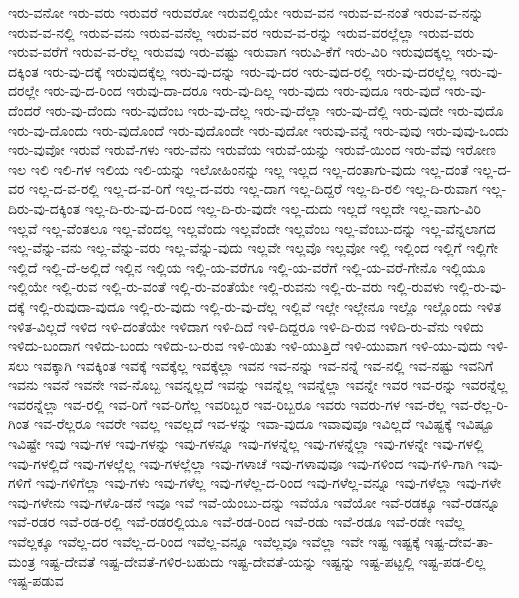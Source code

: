 {ಇರು-ವನೋ
ಇರು-ವರು
ಇರುವರೆ
ಇರುವರೋ
ಇರುವಲ್ಲಿಯೇ
ಇರುವ-ವನ
ಇರುವ-ವ-ನಂತೆ
ಇರುವ-ವ-ನನ್ನು
ಇರುವ-ವ-ನಲ್ಲಿ
ಇರುವ-ವನು
ಇರುವ-ವನೆಲ್ಲ
ಇರುವ-ವರ
ಇರುವ-ವ-ರನ್ನು
ಇರುವ-ವರಲ್ಲೆಲ್ಲಾ
ಇರುವ-ವರು
ಇರುವ-ವರೆಗೆ
ಇರುವ-ವ-ರೆಲ್ಲ
ಇರುವವು
ಇರು-ವಷ್ಟು
ಇರುವಾಗ
ಇರುವಿ-ಕೆಗೆ
ಇರು-ವಿರಿ
ಇರುವುದಕ್ಕಲ್ಲ
ಇರು-ವು-ದಕ್ಕಿಂತ
ಇರು-ವು-ದಕ್ಕೆ
ಇರುವುದಕ್ಕೆಲ್ಲ
ಇರು-ವು-ದನ್ನು
ಇರು-ವು-ದರ
ಇರು-ವುದ-ರಲ್ಲಿ
ಇರು-ವು-ದರಲ್ಲೆಲ್ಲ
ಇರು-ವು-ದರಲ್ಲೇ
ಇರು-ವು-ದ-ರಿಂದ
ಇರುವು-ದಾ-ದರೂ
ಇರು-ವು-ದಿಲ್ಲ
ಇರು-ವುದು
ಇರು-ವುದೂ
ಇರು-ವುದೆ
ಇರು-ವು-ದೆಂದರೆ
ಇರು-ವು-ದೆಂದು
ಇರು-ವುದೆಂಬ
ಇರು-ವು-ದೆಲ್ಲ
ಇರು-ವು-ದೆಲ್ಲಾ
ಇರು-ವು-ದೆಲ್ಲಿ
ಇರು-ವುದೇ
ಇರು-ವುದೊ
ಇರು-ವು-ದೊಂದು
ಇರು-ವುದೊಂದೆ
ಇರು-ವುದೊಂದೇ
ಇರು-ವುದೋ
ಇರುವು-ವನ್ನೆ
ಇರು-ವುವು
ಇರು-ವುವು-ಒಂದು
ಇರು-ವುವೋ
ಇರುವೆ
ಇರುವೆ-ಗಳು
ಇರು-ವೆನು
ಇರುವೆಯ
ಇರುವೆ-ಯನ್ನು
ಇರುವೆ-ಯಿಂದ
ಇರು-ವೆವು
ಇರೋಣ
ಇಲ
ಇಲಿ
ಇಲಿ-ಗಳ
ಇಲಿಯ
ಇಲಿ-ಯನ್ನು
ಇಲೋಹಿಂನನ್ನು
ಇಲ್ಲ
ಇಲ್ಲದ
ಇಲ್ಲ-ದಂತಾಗು-ವುದು
ಇಲ್ಲ-ದಂತೆ
ಇಲ್ಲ-ದ-ವರ
ಇಲ್ಲ-ದ-ವ-ರಲ್ಲಿ
ಇಲ್ಲ-ದ-ವ-ರಿಗೆ
ಇಲ್ಲ-ದ-ವರು
ಇಲ್ಲ-ದಾಗ
ಇಲ್ಲ-ದಿದ್ದರೆ
ಇಲ್ಲ-ದಿ-ರಲಿ
ಇಲ್ಲ-ದಿ-ರುವಾಗ
ಇಲ್ಲ-ದಿರು-ವು-ದಕ್ಕಿಂತ
ಇಲ್ಲ-ದಿ-ರು-ವು-ದ-ರಿಂದ
ಇಲ್ಲ-ದಿ-ರು-ವುದೇ
ಇಲ್ಲ-ದುದು
ಇಲ್ಲದೆ
ಇಲ್ಲದೇ
ಇಲ್ಲ-ವಾಗು-ವಿರಿ
ಇಲ್ಲವೆ
ಇಲ್ಲ-ವೆಂತಲೂ
ಇಲ್ಲ-ವೆಂದಲ್ಲ
ಇಲ್ಲವೆಂದು
ಇಲ್ಲವೆಂದೇ
ಇಲ್ಲವೆಂಬ
ಇಲ್ಲ-ವೆಂಬು-ದನ್ನು
ಇಲ್ಲ-ವೆನ್ನಲಾಗದ
ಇಲ್ಲ-ವೆನ್ನು-ವನು
ಇಲ್ಲ-ವೆನ್ನು-ವರು
ಇಲ್ಲ-ವೆನ್ನು-ವುದು
ಇಲ್ಲವೇ
ಇಲ್ಲವೊ
ಇಲ್ಲವೋ
ಇಲ್ಲಿ
ಇಲ್ಲಿಂದ
ಇಲ್ಲಿಗೆ
ಇಲ್ಲಿಗೇ
ಇಲ್ಲಿದೆ
ಇಲ್ಲಿ-ದೆ-ಅಲ್ಲಿದೆ
ಇಲ್ಲಿನ
ಇಲ್ಲಿಯ
ಇಲ್ಲಿ-ಯ-ವರೆಗೂ
ಇಲ್ಲಿ-ಯ-ವರೆಗೆ
ಇಲ್ಲಿ-ಯ-ವರೆ-ಗೇನೊ
ಇಲ್ಲಿಯೂ
ಇಲ್ಲಿಯೇ
ಇಲ್ಲಿ-ರುವ
ಇಲ್ಲಿ-ರು-ವಂತೆ
ಇಲ್ಲಿ-ರು-ವಂತೆಯೇ
ಇಲ್ಲಿ-ರುವನು
ಇಲ್ಲಿ-ರು-ವರು
ಇಲ್ಲಿ-ರುವಳು
ಇಲ್ಲಿ-ರು-ವು-ದಕ್ಕೆ
ಇಲ್ಲಿ-ರುವುದಾ-ವುದೂ
ಇಲ್ಲಿ-ರು-ವುದು
ಇಲ್ಲಿ-ರು-ವು-ದೆಲ್ಲ
ಇಲ್ಲಿವೆ
ಇಲ್ಲೇ
ಇಲ್ಲೇನೂ
ಇಲ್ಲೊ
ಇಲ್ಲೊಂದು
ಇಳಿತ
ಇಳಿತ-ವಿಲ್ಲದೆ
ಇಳಿದ
ಇಳಿ-ದಂತೆಯೇ
ಇಳಿದಾಗ
ಇಳಿ-ದಿದೆ
ಇಳಿ-ದಿದ್ದರೂ
ಇಳಿ-ದಿ-ರುವ
ಇಳಿದಿ-ರು-ವೆನು
ಇಳಿದು
ಇಳಿದು-ಬಂದಾಗ
ಇಳಿದು-ಬಂದು
ಇಳಿದು-ಬ-ರುವ
ಇಳಿ-ಯಿತು
ಇಳಿ-ಯುತ್ತಿದೆ
ಇಳಿ-ಯುವಾಗ
ಇಳಿ-ಯು-ವುದು
ಇಳಿ-ಸಲು
ಇವಕ್ಕಾಗಿ
ಇವಕ್ಕಿಂತ
ಇವಕ್ಕೆ
ಇವಕ್ಕೆಲ್ಲ
ಇವಕ್ಕೆಲ್ಲಾ
ಇವನ
ಇವ-ನನ್ನು
ಇವ-ನನ್ನೆ
ಇವ-ನಲ್ಲಿ
ಇವ-ನಷ್ಟು
ಇವನಿಗೆ
ಇವನು
ಇವನೆ
ಇವನೇ
ಇವ-ನೊಬ್ಬ
ಇವನ್ನಲ್ಲದೆ
ಇವನ್ನು
ಇವನ್ನೆಲ್ಲ
ಇವನ್ನೆಲ್ಲಾ
ಇವನ್ನೇ
ಇವರ
ಇವ-ರನ್ನು
ಇವರನ್ನೆಲ್ಲ
ಇವರನ್ನೆಲ್ಲಾ
ಇವ-ರಲ್ಲಿ
ಇವ-ರಿಗೆ
ಇವ-ರಿಗೆಲ್ಲ
ಇವರಿಬ್ಬರ
ಇವ-ರಿಬ್ಬರೂ
ಇವರು
ಇವರು-ಗಳ
ಇವ-ರೆಲ್ಲ
ಇವ-ರೆಲ್ಲ-ರಿ-ಗಿಂತ
ಇವ-ರೆಲ್ಲರೂ
ಇವರೇ
ಇವಲ್ಲ
ಇವಲ್ಲದೆ
ಇವ-ಳನ್ನು
ಇವಾ-ವುದೂ
ಇವಾವುವೂ
ಇವಿಲ್ಲದೆ
ಇವಿಷ್ಟಕ್ಕೆ
ಇವಿಷ್ಟೂ
ಇವಿಷ್ಟೇ
ಇವು
ಇವು-ಗಳ
ಇವು-ಗಳನ್ನು
ಇವು-ಗಳನ್ನೂ
ಇವು-ಗಳನ್ನೆಲ್ಲ
ಇವು-ಗಳನ್ನೆಲ್ಲಾ
ಇವು-ಗಳನ್ನೇ
ಇವು-ಗಳಲ್ಲಿ
ಇವು-ಗಳಲ್ಲಿದೆ
ಇವು-ಗಳಲ್ಲೆಲ್ಲ
ಇವು-ಗಳಲ್ಲೆಲ್ಲಾ
ಇವು-ಗಳಾಚೆ
ಇವು-ಗಳಾವುವೂ
ಇವು-ಗಳಿಂದ
ಇವು-ಗಳಿ-ಗಾಗಿ
ಇವು-ಗಳಿಗೆ
ಇವು-ಗಳಿಗೆಲ್ಲಾ
ಇವು-ಗಳು
ಇವು-ಗಳೆಲ್ಲ
ಇವು-ಗಳೆಲ್ಲ-ದ-ರಿಂದ
ಇವು-ಗಳೆಲ್ಲ-ವನ್ನೂ
ಇವು-ಗಳೆಲ್ಲಾ
ಇವು-ಗಳೇ
ಇವು-ಗಳೇನು
ಇವು-ಗಳೊ-ಡನೆ
ಇವೂ
ಇವೆ
ಇವೆ-ಯೆಂಬು-ದನ್ನು
ಇವೆಯೊ
ಇವೆಯೋ
ಇವೆ-ರಡಕ್ಕೂ
ಇವೆ-ರಡನ್ನೂ
ಇವೆ-ರಡರ
ಇವೆ-ರಡ-ರಲ್ಲಿ
ಇವೆ-ರಡರಲ್ಲಿಯೂ
ಇವೆ-ರಡ-ರಿಂದ
ಇವೆ-ರಡು
ಇವೆ-ರಡೂ
ಇವೆ-ರಡೇ
ಇವೆಲ್ಲ
ಇವೆಲ್ಲಕ್ಕೂ
ಇವೆಲ್ಲ-ದರ
ಇವೆಲ್ಲ-ದ-ರಿಂದ
ಇವೆಲ್ಲ-ವನ್ನೂ
ಇವೆಲ್ಲವೂ
ಇವೆಲ್ಲಾ
ಇವೇ
ಇಷ್ಟ
ಇಷ್ಟಕ್ಕೆ
ಇಷ್ಟ-ದೇವ-ತಾ-ಮಂತ್ರ
ಇಷ್ಟ-ದೇವತೆ
ಇಷ್ಟ-ದೇವತೆ-ಗಳಿರ-ಬಹುದು
ಇಷ್ಟ-ದೇವತೆ-ಯನ್ನು
ಇಷ್ಟನ್ನು
ಇಷ್ಟ-ಪಟ್ಟಲ್ಲಿ
ಇಷ್ಟ-ಪಡ-ಲಿಲ್ಲ
ಇಷ್ಟ-ಪಡುವ
}
